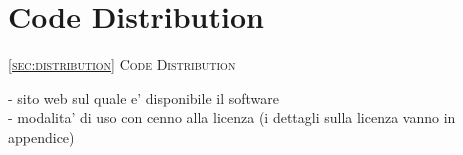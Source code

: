 \section{Code Distribution\label{sec:distribution}}
         {\textsc{\ref{sec:distribution} Code Distribution}}

\noindent
- sito web sul quale e' disponibile il software\\
- modalita' di uso con cenno alla licenza (i dettagli sulla licenza vanno in appendice)